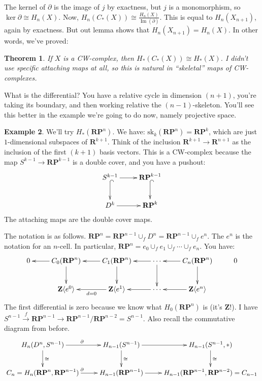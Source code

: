 \documentclass{amsart}
\theoremstyle{theorem}
\newtheorem{theorem}{Theorem}[section]
\theoremstyle{definition}
\newtheorem{example}[theorem]{Example}
\DeclareMathOperator{\img}{Im}
\newcommand{\RP}{\mathbf{RP}}
\newcommand{\Z}{\mathbf Z}
\begin{document}
The kernel of $\partial$ is the image of $j$ by exactness, but $j$ is a monomorphism, so $\ker\partial\cong H_n(X)$. Now, $ H_n(C_\ast(X))\cong\frac{ H_n(X)}{\img(\partial)}$. This is equal to $ H_n(X_{n+1})$, again by exactness. But out lemma shows that $ H_n(X_{n+1})= H_n(X)$. In other words, we've proved:
\begin{theorem}
If $X$ is a CW-complex, then $ H_\ast(C_\ast(X))\cong H_\ast(X)$. I didn't use specific attaching maps at all, so this is natural in ``skeletal'' maps of CW-complexes.
\end{theorem}
What is the differential? You have a relative cycle in dimension $(n+1)$, you're taking its boundary, and then working relative the $(n-1)$-skeleton. You'll see this better in the example we're going to do now, namely projective space.
\begin{example}
We'll try $ H_\ast(\mathbf{RP}^n)$. We have: $\mathrm{sk}_k(\RP^n)=\RP^k$, which are just $1$-dimensional subspaces of $\mathbf{R}^{k+1}$. Think of the inclusion $\mathbf{R}^{k+1}\to\mathbf{R}^{n+1}$ as the inclusion of the first $(k+1)$ basis vectors. This is a CW-complex because the map $S^{k-1}\to \mathbf{RP}^{k-1}$ is a double cover, and you have a pushout:
\begin{equation*}
\xymatrix{S^{k-1}\ar[r]\ar@{^(->}[d] & \mathbf{RP}^{k-1}\ar@{^(->}[d]\\
D^k\ar[r] & \mathbf{RP}^k}
\end{equation*}
The attaching maps are the double cover maps.
\end{example}
The notation is as follows. $\mathbf{RP}^n=\mathbf{RP}^{n-1}\cup_f D^n=\mathbf{RP}^{n-1}\cup_f e^n$. The $e^n$ is the notation for an $n$-cell. In particular, $\mathbf{RP}^n=e_0\cup_f e_1\cup_f\cdots\cup_f e_n$. You have:
\begin{equation*}
\xymatrix{0 & C_0(\mathbf{RP}^n)\ar[d]\ar[l] & C_1(\mathbf{RP}^n)\ar[d]\ar[l] & \cdots\ar[l]\ar[d] & C_n(\mathbf{RP}^n)\ar[d]\ar[l] & 0\\
& \Z\langle e^0\rangle & \Z\langle e^1\rangle\ar[l]^{d=0} & \cdots\ar[l] & \Z\langle e^n\rangle\ar[l]}
\end{equation*}
The first differential is zero because we know what $ H_0(\mathbf{RP}^n)$ is (it's $\Z$!). I have $S^{n-1}\xrightarrow{f}\mathbf{RP}^{n-1}\to \mathbf{RP}^{n-1}/\mathbf{RP}^{n-2}=S^{n-1}$. Also recall the commutative diagram from before.
\begin{equation*}
\xymatrix{ H_n(D^n,S^{n-1})\ar[r]^\partial \ar[d]^\cong & H_{n-1}(S^{n-1})\ar[r]\ar[d]^\cong & H_{n-1}(S^{n-1},\ast)\ar[d]^\cong\\
C_n= H_n(\mathbf{RP}^n,\mathbf{RP}^{n-1})\ar[r]^\partial & H_{n-1}(\mathbf{RP}^{n-1}) \ar[r] & H_{n-1}(\mathbf{RP}^{n-1},\mathbf{RP}^{n-2})=C_{n-1}
}
\end{equation*}
\end{document}
